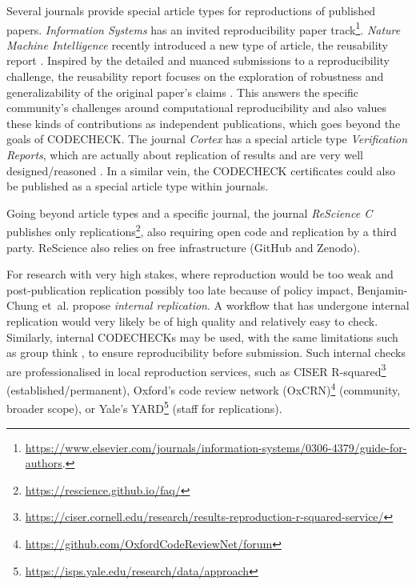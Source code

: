 \documentclass[12pt]{article}
\begin{document}
Several journals provide special article types for reproductions of
published papers.  \emph{Information Systems} has an
invited reproducibility paper track\footnote{
  \url{https://www.elsevier.com/journals/information-systems/0306-4379/guide-for-authors}.}.
\emph{Nature Machine Intelligence} recently introduced a new type of
article, the reusability report \cite{noauthor_research_2020}.
Inspired by the detailed and nuanced submissions to a reproducibility
challenge, the reusability report focuses on the exploration of
robustness and generalizability of the original paper's claims
\cite{noauthor_research_2020}. This answers the specific community's
challenges around computational reproducibility and also values these
kinds of contributions as independent publications, which goes beyond
the goals of CODECHECK.  The journal \emph{Cortex} has a special
article type \emph{Verification Reports}, which are actually about
replication of results and are very well designed/reasoned
\cite{chambers_verification_2020}.  In a similar vein, the CODECHECK
certificates could also be published as a special article type within
journals.

Going beyond article types and a specific journal, the journal
\emph{ReScience C} publishes only
replications\footnote{\url{https://rescience.github.io/faq/}}, also
requiring open code and replication by a third party. ReScience also
relies on free infrastructure (GitHub and Zenodo).

For research with very high stakes, where reproduction would be too weak and
post-publication replication possibly too late because of policy impact,
Benjamin-Chung et~al. \cite{benjamin-chung_internal_2020} propose
\emph{internal replication}.
A workflow that has undergone internal
replication would very likely be of high quality and relatively easy to check.
Similarly, internal CODECHECKs may be used, with the same limitations such
as group think \cite{benjamin-chung_internal_2020},
to ensure reproducibility before submission.
Such internal checks are professionalised in local reproduction services,
such as CISER R-squared\footnote{
\url{https://ciser.cornell.edu/research/results-reproduction-r-squared-service/}} (established/permanent),
Oxford's code review network (OxCRN)\footnote{
\url{https://github.com/OxfordCodeReviewNet/forum}} (community, broader scope), or
Yale's YARD\footnote{
\url{https://isps.yale.edu/research/data/approach}} (staff for replications).
\end{document}

